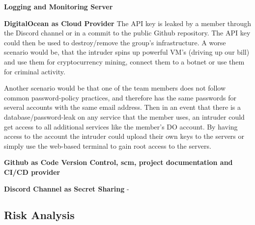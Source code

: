 \textbf{Logging and Monitoring Server}


\textbf{DigitalOcean as Cloud Provider}
The API key is leaked by a member through the Discord channel or in a commit to the public Github repository. The API key could then be used to destroy/remove the group's infrastructure. A worse scenario would be, that the intruder spins up powerful VM's (driving up our bill) and use them for cryptocurrency mining, connect them to a botnet or use them for criminal activity.

Another scenario would be that one of the team members does not follow common password-policy practices, and therefore has the same passwords for several accounts with the same email address. Then in an event that there is a database/password-leak on any service that the member uses, an intruder could get access to all additional services like the member's DO account. By having access to the account the intruder could upload their own keys to the servers or simply use the web-based terminal to gain root access to the servers.   

\textbf{Github as Code Version Control, \acrshort{scm}, project documentation and CI/CD provider}



\textbf{Discord Channel as Secret Sharing} - 

\subsection{Risk Analysis}

